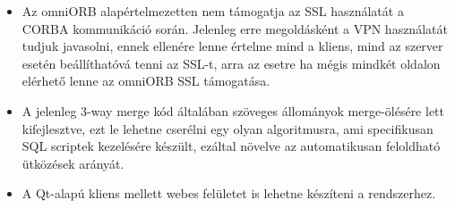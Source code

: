 \documentclass[a4paper,12pt]{article}
\begin{document}
\begin{itemize}
\item Az omniORB alapértelmezetten nem támogatja az SSL használatát a CORBA
kommunikáció során. Jelenleg erre megoldásként a VPN használatát tudjuk
javasolni, ennek ellenére lenne értelme mind a kliens, mind az szerver esetén
beállíthatóvá tenni az SSL-t, arra az esetre ha mégis mindkét oldalon elérhető
lenne az omniORB SSL támogatása.
\item A jelenleg 3-way merge kód általában szöveges állományok merge-ölésére
lett kifejlesztve, ezt le lehetne cserélni egy olyan algoritmusra, ami
specifikusan SQL scriptek kezelésére készült, ezáltal növelve az automatikusan
feloldható ütközések arányát.
\item A Qt-alapú kliens mellett webes felületet is lehetne készíteni a
rendszerhez.
\end{itemize}
\end{document}
